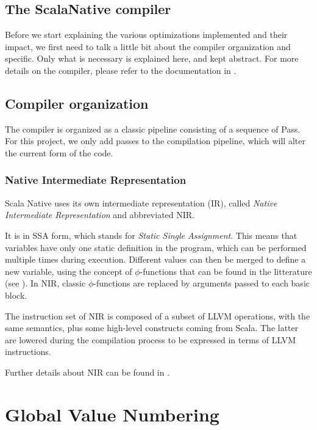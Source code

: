\documentclass[11pt,a4paper]{article}
\newcommand{\scala}[1]{\textsf{#1}}
\begin{document}
\subsection{The ScalaNative compiler}

Before we start explaining the various optimizations implemented and their impact, we first need to talk a little bit about the compiler organization and specific. Only what is necessary is explained here, and kept abstract. For more details on the compiler, please refer to the documentation in \cite{nativedoc}.

\subsection*{Compiler organization}

The compiler is organized as a classic pipeline consisting of a sequence of \scala{Pass}.  For this project, we only add passes to the compilation pipeline, which will alter the current form of the code.

\subsubsection*{Native Intermediate Representation}

Scala Native uses its own intermediate representation (IR), called \textit{Native Intermediate Representation} and abbreviated NIR.

It is in SSA form, which stands for \textit{Static Single Assignment}. This means that variables have only one static definition in the program, which can be performed multiple times during execution. Different values can then be merged to define a new variable, using the concept of $\phi$-functions that can be found in the litterature (see \cite{ssabook}). In NIR, classic $\phi$-functions are replaced by arguments passed to each basic block.

The instruction set of NIR is composed of a subset of LLVM operations, with the same semantics, plus some high-level constructs coming from Scala. The latter are lowered during the compilation process to be expressed in terms of LLVM instructions.

Further details about NIR can be found in \cite{nirdoc}.

\section{Global Value Numbering}
\end{document}
